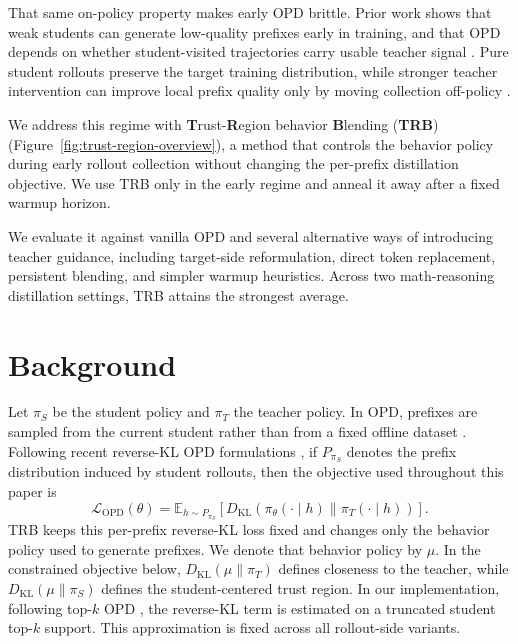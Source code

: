 \documentclass{llmxive}
\begin{document}
That same on-policy property makes early OPD brittle. Prior work shows that weak students can generate low-quality prefixes early in training, and that OPD depends on whether student-visited trajectories carry usable teacher signal \citep{skd,li2026rethinking}. Pure student rollouts preserve the target training distribution, while stronger teacher intervention can improve local prefix quality only by moving collection off-policy \citep{skd,li2026rethinking}.

We address this regime with \textbf{T}rust-\textbf{R}egion behavior \textbf{B}lending (\textbf{TRB}) (Figure~\ref{fig:trust-region-overview}), a method that controls the behavior policy during early rollout collection without changing the per-prefix distillation objective. We use TRB only in the early regime and anneal it away after a fixed warmup horizon.

We evaluate it against vanilla OPD and several alternative ways of introducing teacher guidance, including target-side reformulation, direct token replacement, persistent blending, and simpler warmup heuristics. Across two math-reasoning distillation settings, TRB attains the strongest average.

\section{Background}
\label{sec:background}

Let $\pi_S$ be the student policy and $\pi_T$ the teacher policy.
In OPD, prefixes are sampled from the current student rather than from a fixed offline dataset \citep{opd,li2026rethinking}. Following recent reverse-KL OPD formulations \citep{gu2023minillm,veto,jin2026entropyaware,li2026rethinking}, if $P_{\pi_S}$ denotes the prefix distribution induced by student rollouts, then the objective used throughout this paper is
\begin{equation*}
\mathcal{L}_{\mathrm{OPD}}(\theta)
=
\mathbb{E}_{h \sim P_{\pi_S}}
\left[
D_{\mathrm{KL}}(\pi_\theta(\cdot\mid h)\|\pi_T(\cdot\mid h))
\right].
\end{equation*}
TRB keeps this per-prefix reverse-KL loss fixed and changes only the behavior policy used to generate prefixes. We denote that behavior policy by $\mu$. In the constrained objective below, $D_{\mathrm{KL}}(\mu\|\pi_T)$ defines closeness to the teacher, while $D_{\mathrm{KL}}(\mu\|\pi_S)$ defines the student-centered trust region. In our implementation, following top-$k$ OPD \citep{li2026rethinking}, the reverse-KL term is estimated on a truncated student top-$k$ support. This approximation is fixed across all rollout-side variants.
\end{document}

